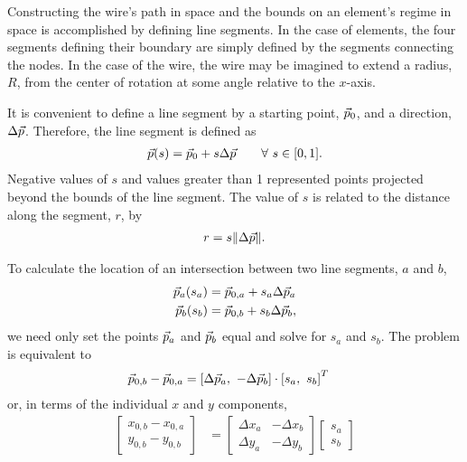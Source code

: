 Constructing the wire's path in space and the bounds on an element's regime in space is accomplished by defining line segments.  In the case of elements, the four segments defining their boundary are simply defined by the segments connecting the nodes.  In the case of the wire, the wire may be imagined to extend a radius, $R$, from the center of rotation at some angle relative to the $x$-axis.

It is convenient to define a line segment by a starting point, $\vec{p}_0$, and a direction, $\Delta \vec{p}$.  Therefore, the line segment is defined as
\begin{align}
\vec{p}(s) = \vec{p}_0 + s \Delta \vec{p} \hspace{2em} \forall \ s\in[0,1].
\end{align}
Negative values of $s$ and values greater than 1 represented points projected beyond the bounds of the line segment.  The value of $s$ is related to the distance along the segment, $r$, by
\begin{align}
r = s \| \Delta \vec{p} \|.
\end{align}

To calculate the location of an intersection between two line segments, $a$ and $b$,
\begin{align}
\vec{p}_a(s_a) &= \vec{p}_{0,a} + s_a \Delta \vec{p}_a\nonumber\\
\vec{p}_b(s_b) &= \vec{p}_{0,b} + s_b \Delta \vec{p}_b\nonumber,
\end{align}
we need only set the points $\vec{p}_a$ and $\vec{p}_b$ equal and solve for $s_a$ and $s_b$.  The problem is equivalent to
\begin{align}
\vec{p}_{0,b} - \vec{p}_{0,a} &= \left[\Delta \vec{p}_a,\ -\Delta \vec{p}_b\right] \cdot \left[s_a,\ s_b\right]^T
\end{align}
or, in terms of the individual $x$ and $y$ components,
\begin{align}
\left[\begin{array}{c}
x_{0,b} - x_{0,a}\\
y_{0,b} - y_{0,b}
\end{array}\right] &= 
\left[\begin{array}{cc}
\Delta x_a & -\Delta x_b\\
\Delta y_a & -\Delta y_b
\end{array}\right]\left[\begin{array}{c}
s_a \\
s_b
\end{array}\right]
\end{align}

